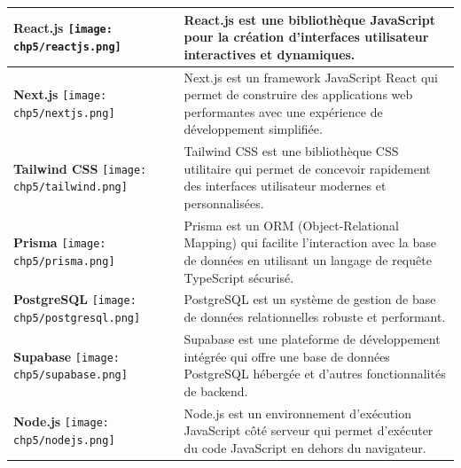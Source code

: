 \begin{longtable}{|p{4cm}|p{11cm}|}
    \hline
    \centering \textbf{React.js} \vspace{0.2cm} \newline \centering \texttt{[image: chp5/reactjs.png]} & React.js est une bibliothèque JavaScript pour la création d'interfaces utilisateur interactives et dynamiques. \\
    \hline
    \centering \textbf{Next.js} \vspace{0.2cm} \newline \centering \texttt{[image: chp5/nextjs.png]} & Next.js est un framework JavaScript React qui permet de construire des applications web performantes avec une expérience de développement simplifiée. \\
    \hline
    \centering \textbf{Tailwind CSS} \vspace{0.2cm} \newline \centering \texttt{[image: chp5/tailwind.png]} & Tailwind CSS est une bibliothèque CSS utilitaire qui permet de concevoir rapidement des interfaces utilisateur modernes et personnalisées. \\
    \hline
    \centering \textbf{Prisma} \vspace{0.2cm} \newline \centering \texttt{[image: chp5/prisma.png]} & Prisma est un ORM (Object-Relational Mapping) qui facilite l'interaction avec la base de données en utilisant un langage de requête TypeScript sécurisé. \\
    \hline
    \centering \textbf{PostgreSQL} \vspace{0.2cm} \newline \centering \texttt{[image: chp5/postgresql.png]} & PostgreSQL est un système de gestion de base de données relationnelles robuste et performant. \\
    \hline
    \centering \textbf{Supabase} \vspace{0.2cm} \newline \centering \texttt{[image: chp5/supabase.png]} & Supabase est une plateforme de développement intégrée qui offre une base de données PostgreSQL hébergée et d'autres fonctionnalités de backend. \\
    \hline
    \centering \textbf{Node.js} \vspace{0.2cm} \newline \centering \texttt{[image: chp5/nodejs.png]} & Node.js est un environnement d'exécution JavaScript côté serveur qui permet d'exécuter du code JavaScript en dehors du navigateur. \\
    \hline

\end{longtable}
